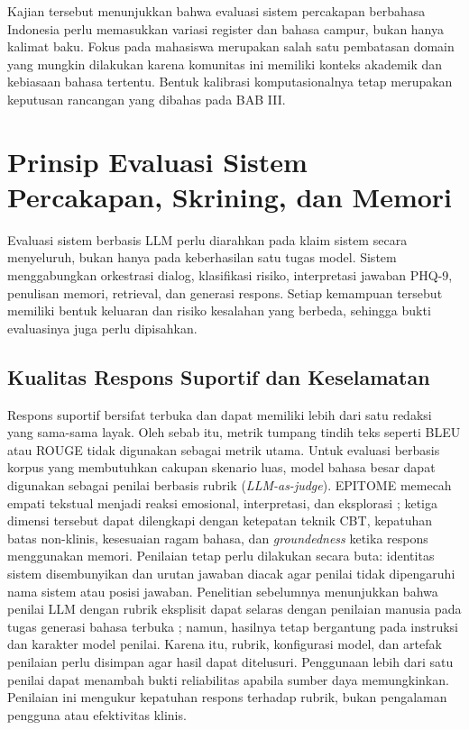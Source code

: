 Kajian tersebut menunjukkan bahwa evaluasi sistem percakapan berbahasa Indonesia perlu memasukkan variasi register dan bahasa campur, bukan hanya kalimat baku. Fokus pada mahasiswa merupakan salah satu pembatasan domain yang mungkin dilakukan karena komunitas ini memiliki konteks akademik dan kebiasaan bahasa tertentu. Bentuk kalibrasi komputasionalnya tetap merupakan keputusan rancangan yang dibahas pada BAB III.

\section{Prinsip Evaluasi Sistem Percakapan, Skrining, dan Memori}
\label{sec:prinsip-evaluasi}

Evaluasi sistem berbasis LLM perlu diarahkan pada klaim sistem secara menyeluruh, bukan hanya pada keberhasilan satu tugas model. Sistem menggabungkan orkestrasi dialog, klasifikasi risiko, interpretasi jawaban PHQ-9, penulisan memori, retrieval, dan generasi respons. Setiap kemampuan tersebut memiliki bentuk keluaran dan risiko kesalahan yang berbeda, sehingga bukti evaluasinya juga perlu dipisahkan.

\subsection{Kualitas Respons Suportif dan Keselamatan}

Respons suportif bersifat terbuka dan dapat memiliki lebih dari satu redaksi yang sama-sama layak. Oleh sebab itu, metrik tumpang tindih teks seperti BLEU atau ROUGE tidak digunakan sebagai metrik utama. Untuk evaluasi berbasis korpus yang membutuhkan cakupan skenario luas, model bahasa besar dapat digunakan sebagai penilai berbasis rubrik (\textit{LLM-as-judge}). EPITOME memecah empati tekstual menjadi reaksi emosional, interpretasi, dan eksplorasi \parencite{sharma2020epitome}; ketiga dimensi tersebut dapat dilengkapi dengan ketepatan teknik CBT, kepatuhan batas non-klinis, kesesuaian ragam bahasa, dan \textit{groundedness} ketika respons menggunakan memori. Penilaian tetap perlu dilakukan secara buta: identitas sistem disembunyikan dan urutan jawaban diacak agar penilai tidak dipengaruhi nama sistem atau posisi jawaban. Penelitian sebelumnya menunjukkan bahwa penilai LLM dengan rubrik eksplisit dapat selaras dengan penilaian manusia pada tugas generasi bahasa terbuka \parencite{liu2023geval,zheng2023judging}; namun, hasilnya tetap bergantung pada instruksi dan karakter model penilai. Karena itu, rubrik, konfigurasi model, dan artefak penilaian perlu disimpan agar hasil dapat ditelusuri. Penggunaan lebih dari satu penilai dapat menambah bukti reliabilitas apabila sumber daya memungkinkan. Penilaian ini mengukur kepatuhan respons terhadap rubrik, bukan pengalaman pengguna atau efektivitas klinis.

